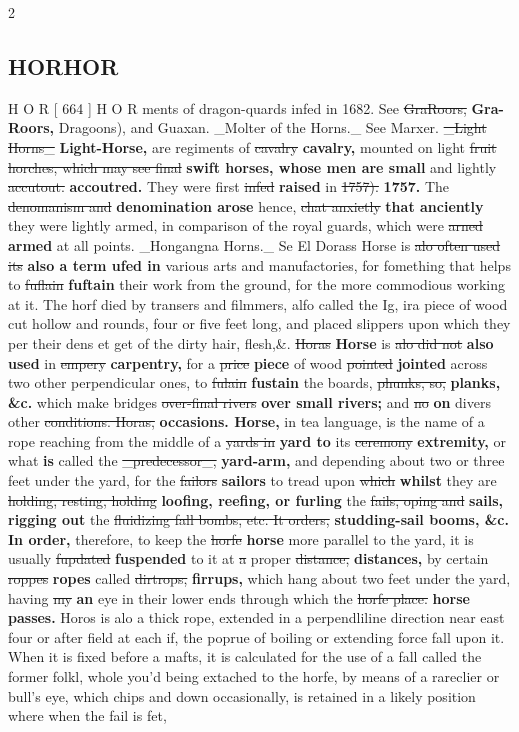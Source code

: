 \documentclass[10pt]{article}
\begin{document}
\begin{multicols}{2}
\subsection*{HORHOR}
H O R [ 664 ] H O R ments of dragon-quards infed in 1682. See \sout{GraRoors,} \textbf{Gra- Roors,} Dragoons), and Guaxan. \_Molter of the Horns.\_ See Marxer. \sout{\_Light Horns\_} \textbf{Light-Horse,} are regiments of \sout{cavalry} \textbf{cavalry,} mounted on light \sout{fruit horches, which may see final} \textbf{swift horses, whose men are small} and lightly \sout{accutout.} \textbf{accoutred.} They were first \sout{infed} \textbf{raised} in \sout{1757).} \textbf{1757.} The \sout{denomanism and} \textbf{denomination arose} hence, \sout{chat anxietly} \textbf{that anciently} they were lightly armed, in comparison of the royal guards, which were \sout{arned} \textbf{armed} at all points. \_Hongangna Horns.\_ Se El Dorass Horse is \sout{alo often used its} \textbf{also a term ufed in} various arts and manufactories, for fomething that helps to \sout{fuflain} \textbf{fuftain} their work from the ground, for the more commodious working at it. The horf died by transers and filmmers, alfo called the Ig, ira piece of wood cut hollow and rounds, four or five feet long, and placed slippers upon which they per their dens et get of the dirty hair, flesh,\&. \sout{Horas} \textbf{Horse} is \sout{alo did not} \textbf{also used} in \sout{empery} \textbf{carpentry,} for a \sout{price} \textbf{piece} of wood \sout{pointed} \textbf{jointed} across two other perpendicular ones, to \sout{fulain} \textbf{fustain} the boards, \sout{phunks, so,} \textbf{planks, \&c.} which make bridges \sout{over-final rivers} \textbf{over small rivers;} and \sout{no} \textbf{on} divers other \sout{conditions. Horas,} \textbf{occasions. Horse,} in tea language, is the name of a rope reaching from the middle of a \sout{yards in} \textbf{yard to} its \sout{ceremony} \textbf{extremity,} or what \textbf{is} called the \sout{\_predecessor\_,} \textbf{yard-arm,} and depending about two or three feet under the yard, for the \sout{failors} \textbf{sailors} to tread upon \sout{which} \textbf{whilst} they are \sout{holding, resting, holding} \textbf{loofing, reefing, or furling} the \sout{fails, oping and} \textbf{sails, rigging out} the \sout{fluidizing fall bombs, etc. It orders,} \textbf{studding-sail booms, \&c. In order,} therefore, to keep the \sout{horfe} \textbf{horse} more parallel to the yard, it is usually \sout{fupdated} \textbf{fuspended} to it at \sout{a} proper \sout{distance,} \textbf{distances,} by certain \sout{roppes} \textbf{ropes} called \sout{dirtrops,} \textbf{firrups,} which hang about two feet under the yard, having \sout{my} \textbf{an} eye in their lower ends through which the \sout{horfe place.} \textbf{horse passes.} Horos is alo a thick rope, extended in a perpendliline direction near east four or after field at each if, the poprue of boiling or extending force fall upon it. When it is fixed before a mafts, it is calculated for the use of a fall called the former folkl, whole you'd being extached to the horfe, by means of a rareclier or bull's eye, which chips and down occasionally, is retained in a likely position where when the fail is fet, 
\end{multicols}
\end{document}
